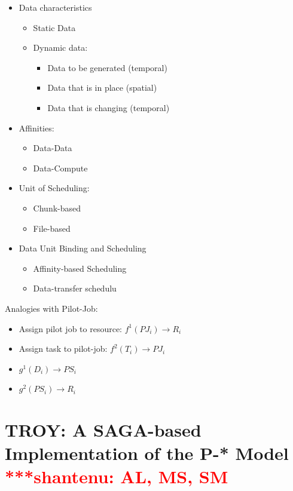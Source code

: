 \documentclass[conference,final]{IEEEtran}
\newcommand{\jhanote}[1]{ {\textcolor{red} { ***shantenu: #1 }}}
\newcommand{\jhanote}[1]{}
\begin{document}
\begin{itemize}
    \item Data characteristics
    \begin{itemize}
    \item Static Data
    \item Dynamic data:
    \begin{itemize}
    	\item Data to be generated (temporal)
    	\item Data that is in place (spatial)
    	\item Data that is changing (temporal)
    \end{itemize}
    \end{itemize}        
    \item Affinities:
    \begin{itemize}
        \item Data-Data
        \item Data-Compute
    \end{itemize}
    \item Unit of Scheduling:
    \begin{itemize}
        \item Chunk-based
        \item File-based
    \end{itemize}
    \item Data Unit Binding and Scheduling
    \begin{itemize}
        \item Affinity-based Scheduling
        \item Data-transfer schedulu
    \end{itemize}    
\end{itemize}



\noindent
Analogies with Pilot-Job:
\begin{itemize}
	\item Assign pilot job to resource: $f^{1}(PJ_i) \rightarrow R_i$
	\item Assign task to pilot-job: $f^{2}(T_i) \rightarrow PJ_i$ 
	\item $g^{1} (D_i) \rightarrow PS_i$
	\item $g^{2} (PS_i) \rightarrow R_i$
\end{itemize}


\section{TROY: A SAGA-based Implementation of the P-* Model
  \jhanote{AL, MS, SM}}
\end{document}
